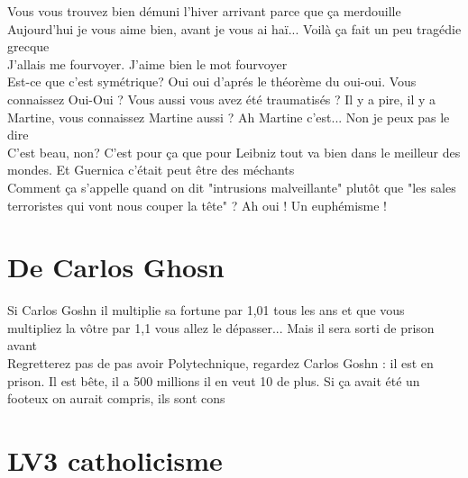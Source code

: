 \documentclass[french, a4paper, openany]{book}
\begin{document}
	\noindent \og Vous vous trouvez bien démuni l'hiver arrivant parce que ça merdouille \fg \\
	\og Aujourd'hui je vous aime bien, avant je vous ai haï... Voilà ça fait un peu tragédie grecque \fg \\
	\og J'allais me fourvoyer. J'aime bien le mot fourvoyer \fg \\
	\og Est-ce que c'est symétrique? Oui oui d'aprés le théorème du oui-oui. Vous connaissez Oui-Oui ? Vous aussi vous avez été traumatisés ? Il y a pire, il y a Martine, vous connaissez Martine aussi ? Ah Martine c'est... Non je peux pas le dire \fg \\
	\og C'est beau, non? C'est pour ça que pour Leibniz tout va bien dans le meilleur des mondes. Et Guernica c'était peut être des méchants \fg \\	
	\og Comment ça s'appelle quand on dit "intrusions malveillante" plutôt que "les sales terroristes qui vont nous couper la tête" ? Ah oui ! Un euphémisme ! \fg \\
 
\section{De Carlos Ghosn}

	\noindent \og Si Carlos Goshn il multiplie sa fortune par 1,01 tous les ans et que vous multipliez la vôtre par 1,1 vous allez le dépasser... Mais il sera sorti de prison avant \fg \\
	\og Regretterez pas de pas avoir Polytechnique, regardez Carlos Goshn : il est en prison. Il est bête, il a 500 millions il en veut 10 de plus. Si ça avait été un footeux on aurait compris, ils sont cons \fg \\

\section{LV3 catholicisme} 
 
\end{document}
